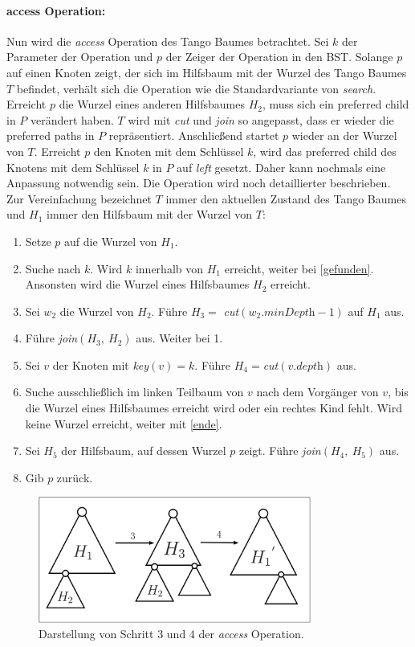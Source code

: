 \documentclass[a4paper,12pt]{article}
\begin{document}
\paragraph{access Operation:}
Nun wird die \textit{access} Operation des Tango Baumes betrachtet. Sei $k$ der Parameter der Operation und $p$ der Zeiger der Operation in den BST. Solange $p$ auf einen Knoten zeigt, der sich im Hilfsbaum mit der Wurzel des Tango Baumes $T$ befindet, verhält sich die Operation wie die Standardvariante von \textit{search}. Erreicht $p$ die Wurzel eines anderen Hilfsbaumes $H_2$, muss sich ein preferred child in $P$ verändert haben. $T$ wird mit \textit{cut} und \textit{join} so angepasst, dass er wieder die preferred paths in $P$ repräsentiert. Anschließend startet $p$ wieder an der Wurzel von $T$. Erreicht $p$ den Knoten mit dem Schlüssel $k$, wird das preferred child des Knotens mit dem Schlüssel $k$ in $P$ auf \textit{left} gesetzt. Daher kann nochmals eine Anpassung notwendig sein. Die Operation wird noch detaillierter beschrieben. Zur Vereinfachung bezeichnet $T$ immer den aktuellen Zustand des Tango Baumes und $H_1$ immer den Hilfsbaum mit der Wurzel von $T$:
\begin{enumerate}
	\item Setze $p$ auf die Wurzel von $H_1$.
	\item Suche nach $k$. Wird $k$ innerhalb von $H_1$ erreicht, weiter bei \ref{gefunden}. Ansonsten wird die Wurzel eines Hilfsbaumes $H_2$ erreicht.
	\item Sei $w_2$ die Wurzel von $H_2$. Führe $H_3 =$ \textit{cut}$\left(w_2.\textit{minDepth} - 1\right)$ auf $H_1$ aus.
	\item Führe \textit{join}$\left(H_3, ~H_2\right)$ aus. Weiter bei 1.
	\item \label{gefunden} Sei $v$ der Knoten mit \textit{key}$\left(v\right) = k$. Führe $H_4=$\textit{cut}$ \left(v.\textit{depth}\right)$ aus. 
	\item Suche ausschließlich im linken Teilbaum von $v$ nach dem Vorgänger von $v$, bis die Wurzel eines Hilfsbaumes erreicht wird oder ein rechtes Kind fehlt. Wird keine Wurzel erreicht, weiter mit \ref{ende}.
	\item Sei $H_5$ der Hilfsbaum, auf dessen Wurzel $p$ zeigt. Führe \textit{join}$\left(H_4, ~H_5\right)$ aus.
	\item \label{ende} Gib $p$ zurück.
\end{enumerate}
\begin{figure}[H]
	\centering
	\includegraphics[width=0.8\textwidth]{Medien/Tango/cutJoin}
	\caption{Darstellung von Schritt $3$ und $4$ der \textit{access} Operation. }
	\label{fig:cutJoin}
\end{figure}
\end{document}

